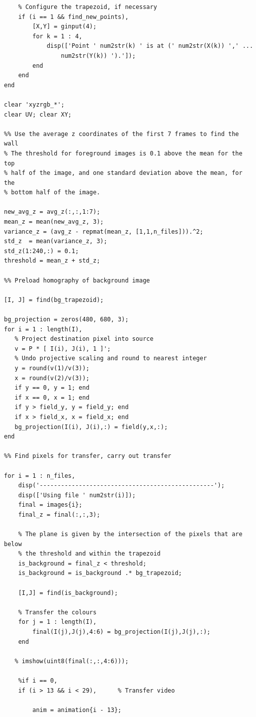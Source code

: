 \documentclass[11pt]{article}
\begin{document}
\begin{verbatim}
    % Configure the trapezoid, if necessary
    if (i == 1 && find_new_points),
        [X,Y] = ginput(4);
        for k = 1 : 4,
            disp(['Point ' num2str(k) ' is at (' num2str(X(k)) ',' ...
                num2str(Y(k)) ').']);
        end
    end
end

clear 'xyzrgb_*';
clear UV; clear XY;

%% Use the average z coordinates of the first 7 frames to find the wall
% The threshold for foreground images is 0.1 above the mean for the top
% half of the image, and one standard deviation above the mean, for the
% bottom half of the image.

new_avg_z = avg_z(:,:,1:7);
mean_z = mean(new_avg_z, 3);
variance_z = (avg_z - repmat(mean_z, [1,1,n_files])).^2;
std_z  = mean(variance_z, 3);
std_z(1:240,:) = 0.1;
threshold = mean_z + std_z;

%% Preload homography of background image

[I, J] = find(bg_trapezoid);

bg_projection = zeros(480, 680, 3);
for i = 1 : length(I),
   % Project destination pixel into source
   v = P * [ I(i), J(i), 1 ]';        
   % Undo projective scaling and round to nearest integer
   y = round(v(1)/v(3));              
   x = round(v(2)/v(3));
   if y == 0, y = 1; end
   if x == 0, x = 1; end
   if y > field_y, y = field_y; end
   if x > field_x, x = field_x; end
   bg_projection(I(i), J(i),:) = field(y,x,:);
end

%% Find pixels for transfer, carry out transfer

for i = 1 : n_files,
    disp('-------------------------------------------------');
    disp(['Using file ' num2str(i)]);
    final = images{i};
    final_z = final(:,:,3);

    % The plane is given by the intersection of the pixels that are below
    % the threshold and within the trapezoid
    is_background = final_z < threshold;
    is_background = is_background .* bg_trapezoid;
    
    [I,J] = find(is_background);
    
    % Transfer the colours
    for j = 1 : length(I),
        final(I(j),J(j),4:6) = bg_projection(I(j),J(j),:);
    end
    
   % imshow(uint8(final(:,:,4:6)));
    
    %if i == 0,
    if (i > 13 && i < 29),      % Transfer video
        
        anim = animation{i - 13};


\end{verbatim}
\end{document}
